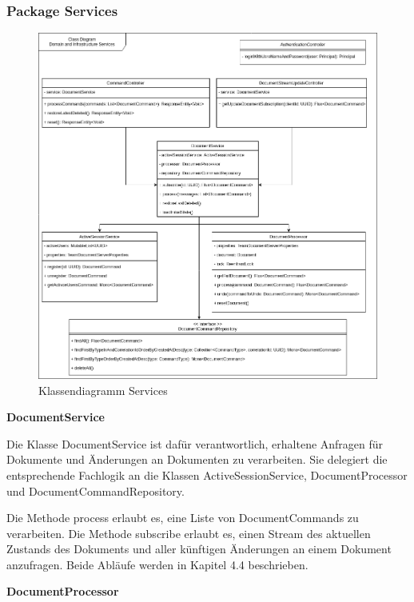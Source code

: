 \subsubsection{Package Services}

\begin{figure}[h]
    \centering
    \begin{minipage}[b]{0.8\textwidth}
        \includegraphics[width=\textwidth]{images/class-be.drawio}
        \caption{Klassendiagramm Services}
    \end{minipage}
\end{figure}


\textbf{DocumentService}

Die Klasse DocumentService ist dafür verantwortlich, erhaltene Anfragen für Dokumente und Änderungen an Dokumenten zu verarbeiten.
Sie delegiert die entsprechende Fachlogik an die Klassen ActiveSessionService, DocumentProcessor und DocumentCommandRepository.

Die Methode process erlaubt es, eine Liste von DocumentCommands zu verarbeiten.
Die Methode subscribe erlaubt es, einen Stream des aktuellen Zustands des Dokuments und aller künftigen Änderungen an einem Dokument anzufragen.
Beide Abläufe werden in Kapitel 4.4 beschrieben.

\textbf{DocumentProcessor}

